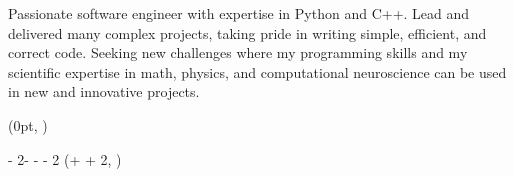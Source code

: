 \documentclass[11pt, a4paper]{resume}
\begin{document}
\makecvheader %

\begin{cvsummary}
Passionate software engineer with expertise in Python and C++. Lead and delivered many complex projects, taking pride in writing simple, efficient, and correct code. Seeking new challenges where my programming skills and my scientific expertise in math, physics, and computational neuroscience can be used in new and innovative projects.
\end{cvsummary}



\setlength{\headersmargin}{-0.2cm}
\setlength{\leftcolumnwidth}{5cm}
\setlength{\columnsmargin}{0.5\sidemargin}
\setlength{\timelinemargin}{0.5cm}


\begin{textblock*}{\leftcolumnwidth}(0pt, \headersmargin)
    \vspace{-2mm}
    
    \vspace{3mm}
    
    \vspace{3.5mm}
    
\end{textblock*}

\begin{textblock*}
    {\paperwidth - 2\sidemargin - \leftcolumnwidth - \columnsmargin - 2\timelinemargin}
    (\leftcolumnwidth + \columnsmargin + 2\timelinemargin, \headersmargin)
    \vspace{-2mm}
    
    
    
\end{textblock*}

\end{document}
